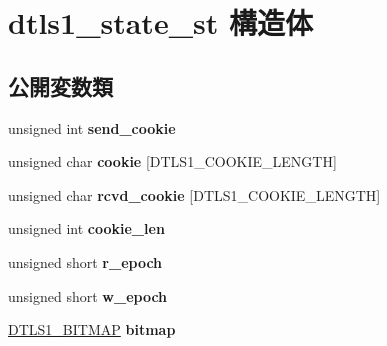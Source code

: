 \hypertarget{structdtls1__state__st}{}\section{dtls1\+\_\+state\+\_\+st 構造体}
\label{structdtls1__state__st}
\subsection*{公開変数類}
\begin{DoxyCompactItemize}
\item 
\hypertarget{structdtls1__state__st_af87b8915e3c04aa1e8c858e15a967b2d}{}unsigned int {\bfseries send\+\_\+cookie}\label{structdtls1__state__st_af87b8915e3c04aa1e8c858e15a967b2d}

\item 
\hypertarget{structdtls1__state__st_a3600731c890da666b152e0bea4b17644}{}unsigned char {\bfseries cookie} \mbox{[}D\+T\+L\+S1\+\_\+\+C\+O\+O\+K\+I\+E\+\_\+\+L\+E\+N\+G\+T\+H\mbox{]}\label{structdtls1__state__st_a3600731c890da666b152e0bea4b17644}

\item 
\hypertarget{structdtls1__state__st_a1a9425f1e37d872f3cc13026092b4ac6}{}unsigned char {\bfseries rcvd\+\_\+cookie} \mbox{[}D\+T\+L\+S1\+\_\+\+C\+O\+O\+K\+I\+E\+\_\+\+L\+E\+N\+G\+T\+H\mbox{]}\label{structdtls1__state__st_a1a9425f1e37d872f3cc13026092b4ac6}

\item 
\hypertarget{structdtls1__state__st_aa91963cca02aa5c981c3c1d5c3c6e472}{}unsigned int {\bfseries cookie\+\_\+len}\label{structdtls1__state__st_aa91963cca02aa5c981c3c1d5c3c6e472}

\item 
\hypertarget{structdtls1__state__st_aa3c8e7915e684e4d99aef7e102c57479}{}unsigned short {\bfseries r\+\_\+epoch}\label{structdtls1__state__st_aa3c8e7915e684e4d99aef7e102c57479}

\item 
\hypertarget{structdtls1__state__st_ac2348d97c73af669675caa7791fc7320}{}unsigned short {\bfseries w\+\_\+epoch}\label{structdtls1__state__st_ac2348d97c73af669675caa7791fc7320}

\item 
\hypertarget{structdtls1__state__st_a3e9ffaed4676ae794845eed4755ef8ce}{}\hyperlink{structdtls1__bitmap__st}{D\+T\+L\+S1\+\_\+\+B\+I\+T\+M\+A\+P} {\bfseries bitmap}\label{structdtls1__state__st_a3e9ffaed4676ae794845eed4755ef8ce}


\end{DoxyCompactItemize}
